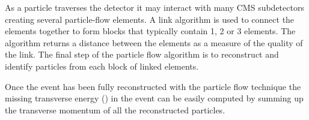 As a particle traverses the detector it may interact with many CMS subdetectors
creating several particle-flow elements. A link algorithm is used to connect
the elements together to form blocks that typically contain 1, 2 or 3 elements.
The algorithm returns a distance between the elements as a measure of the
quality of the link. The final step of the particle flow algorithm is to
reconstruct and identify particles from each block of linked elements.\cite{PF}

Once the event has been fully reconstructed with the particle flow technique
the missing transverse energy (\met) in the event can be easily computed by
summing up the transverse momentum of all the reconstructed particles.\cite{PF}

